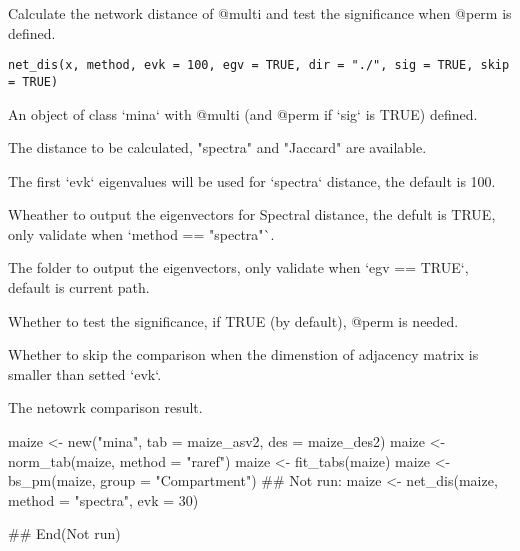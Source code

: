 \documentclass[a4paper]{book}
\begin{document}
%
\begin{Description}\relax
Calculate the network distance of @multi and test the significance when @perm
is defined.
\end{Description}
%
\begin{Usage}
\begin{verbatim}
net_dis(x, method, evk = 100, egv = TRUE, dir = "./", sig = TRUE, skip = TRUE)
\end{verbatim}
\end{Usage}
%
\begin{Arguments}
\begin{ldescription}
\item[\code{x}] An object of class `mina` with @multi (and @perm if `sig` is TRUE)
defined.

\item[\code{method}] The distance to be calculated, "spectra" and "Jaccard" are
available.

\item[\code{evk}] The first `evk` eigenvalues will be used for `spectra` distance,
the default is 100.

\item[\code{egv}] Wheather to output the eigenvectors for Spectral distance, the
defult is TRUE, only validate when `method == "spectra"`.

\item[\code{dir}] The folder to output the eigenvectors, only validate when `egv ==
TRUE`, default is current path.

\item[\code{sig}] Whether to test the significance, if TRUE (by default), @perm is
needed.

\item[\code{skip}] Whether to skip the comparison when the dimenstion of adjacency
matrix is smaller than setted `evk`.
\end{ldescription}
\end{Arguments}
%
\begin{Value}
The netowrk comparison result.
\end{Value}
%
\begin{Examples}
\begin{ExampleCode}
maize <- new("mina", tab = maize_asv2, des = maize_des2)
maize <- norm_tab(maize, method = "raref")
maize <- fit_tabs(maize)
maize <- bs_pm(maize, group = "Compartment")
## Not run: 
maize <- net_dis(maize, method = "spectra", evk = 30)

## End(Not run)
\end{ExampleCode}
\end{Examples}
\end{document}
